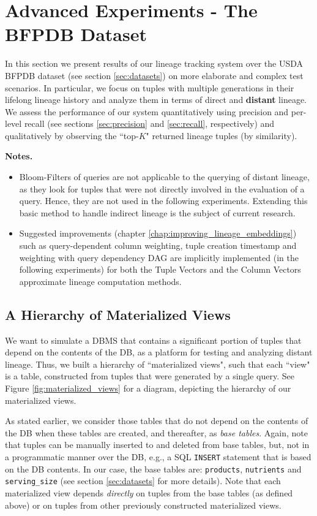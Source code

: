 \section{Advanced Experiments - The BFPDB Dataset}\label{sec:advanced_experiments}
In this section we present results of our lineage tracking system over the USDA BFPDB dataset (see section \ref{sec:datasets}) on more elaborate and complex test scenarios. In particular, we focus on tuples with multiple generations in their lifelong lineage history and analyze them in terms of direct and \textbf{distant} lineage.
We assess the performance of our system quantitatively using precision and per-level recall (see sections \ref{sec:precision} and \ref{sec:recall}, respectively) and qualitatively by observing the ``top-$K$" returned lineage tuples (by similarity).
\par\textbf{Notes.}
\begin{itemize}
    \item Bloom-Filters of queries are not applicable to the querying of distant lineage, as they look for tuples that were not directly involved in the evaluation of a query. Hence, they are not used in the following experiments. Extending this basic method to handle indirect lineage is the subject of current research.
    \item Suggested improvements (chapter \ref{chap:improving_lineage_embeddings}) such as query-dependent column weighting, tuple creation timestamp and weighting with query dependency DAG are implicitly implemented (in the following experiments) for both the Tuple Vectors and the Column Vectors approximate lineage computation methods.
\end{itemize}


\subsection{A Hierarchy of Materialized Views}
We want to simulate a DBMS that contains a significant portion of tuples that depend on the contents of the DB, as a platform for testing and analyzing distant lineage. Thus, we built a hierarchy of ``materialized views", such that each ``view" is a table, constructed from tuples that were generated by a single query. See Figure \ref{fig:materialized_views} for a diagram, depicting the hierarchy of our materialized views.

\par As stated earlier, we consider those tables that do not depend on the contents of the DB when these tables are created, and thereafter, as \textit{base tables}. Again, note that tuples can be manually inserted to and deleted from base tables, but, not in a programmatic manner over the DB, e.g., a SQL \texttt{INSERT} statement that is based on the DB contents. In our case, the base tables are: \texttt{products}, \texttt{nutrients} and \texttt{serving\_size} (see section \ref{sec:datasets} for more details). Note that each materialized view depends \textit{directly} on tuples from the base tables (as defined above) or on tuples from other previously constructed materialized views.

